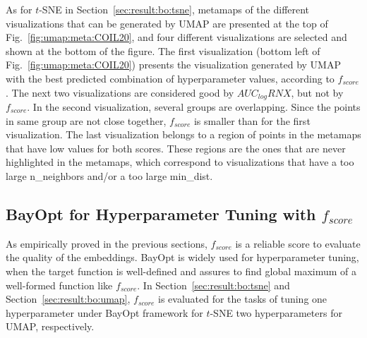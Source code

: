 As for $t$-SNE in Section~\ref{sec:result:bo:tsne}, metamaps of the different visualizations that can be generated by UMAP are presented at the top of Fig.~\ref{fig:umap:meta:COIL20}, and four different visualizations are selected and shown at the bottom of the figure.
The first visualization (bottom left of Fig.~\ref{fig:umap:meta:COIL20}) presents the visualization generated by UMAP with the best predicted combination of hyperparameter values, according to $f_{score}$.
The next two visualizations are considered good by $AUC_{log}RNX$, but not by $f_{score}$.
In the second visualization, several groups are overlapping. Since the points in same group are not close together, $f_{score}$ is smaller than for the first visualization.
The last visualization belongs to a region of points in the metamaps that have low values for both scores.
These regions are the ones that are never highlighted in the metamaps, which correspond to visualizations that have a too large {n\_neighbors} and/or a too large {min\_dist}. 

\subsection{BayOpt for Hyperparameter Tuning with $f_{score}$}\label{sec:result:bo}
As empirically proved in the previous sections, $f_{score}$ is a reliable score to evaluate the quality of the embeddings.
BayOpt is widely used for hyperparameter tuning, when the target function is well-defined and assures to find global maximum of a well-formed function like $f_{score}$.
In Section~\ref{sec:result:bo:tsne} and Section~\ref{sec:result:bo:umap}, $f_{score}$ is evaluated for the tasks of tuning one hyperparameter under BayOpt framework for $t$-SNE two hyperparameters for UMAP, respectively.

